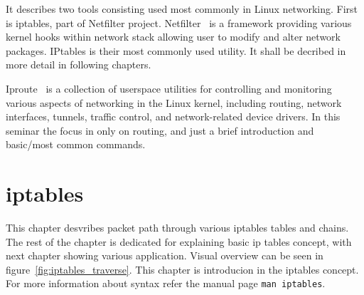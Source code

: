 \documentclass[times, utf8, seminar, english]{fer}
\begin{document}
It describes two tools consisting used most commonly in Linux networking. First is iptables, part of Netfilter project. Netfilter~\cite{netfilte6:online} is a framework providing various kernel hooks within network stack allowing user to modify and alter network packages. IPtables is their most commonly used utility. It shall be decribed in more detail in following chapters.

Iproute~\cite{shemming47:online} is a collection of userspace utilities for controlling and monitoring various aspects of networking in the Linux kernel, including routing, network interfaces, tunnels, traffic control, and network-related device drivers. In this seminar the focus in only on routing, and just a brief introduction and basic/most common commands.

\chapter{iptables}
This chapter desvribes packet path through various iptables tables and chains. The rest of the chapter is dedicated for explaining basic ip tables concept, with next chapter showing various application.
Visual overview can be seen in figure~\ref{fig:iptables_traverse}. This chapter is introducion in the iptables concept. For more information about syntax refer the manual page \verb|man iptables|.
\end{document}
